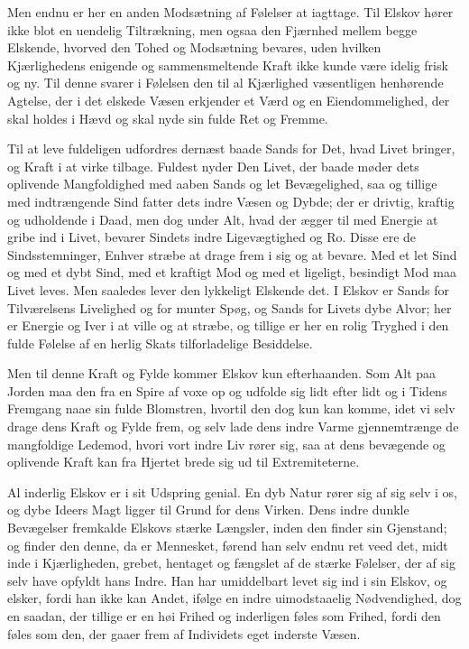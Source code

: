 \documentclass[12pt,a4paper]{book}
\newcommand{\apage}[1]{\marginnote{\footnotesize\textit{[#1]}}}
\begin{document}
Men endnu er her en anden Modsætning af Følelser at iagttage. Til Elskov
hører ikke blot en uendelig Tiltrækning, men ogsaa den Fjærnhed mellem
begge Elskende, hvorved den Tohed og Modsætning bevares, uden hvilken
Kjærlighedens enigende og sammensmeltende Kraft ikke kunde være idelig
frisk og ny. Til denne svarer i Følelsen den til al Kjærlighed
væsentligen henhørende Agtelse, der i det elskede Væsen erkjender et
Værd og en Eiendommelighed, der skal holdes i Hævd og skal nyde sin
fulde Ret og Fremme.

Til at leve fuldeligen udfordres dernæst baade Sands for Det, hvad Livet
bringer, og Kraft i at virke tilbage. Fuldest nyder Den Livet, der baade
møder dets oplivende Mangfoldighed med aaben Sands og let Bevægelighed,
saa og tillige med indtrængende Sind fatter dets indre Væsen og Dybde;
der er drivtig, kraftig og udholdende i Daad, men dog under Alt, hvad
der ægger til med Energie at gribe ind i Livet, bevarer Sindets indre
Ligevægtighed og Ro. Disse ere de Sindsstemninger, Enhver stræbe at
drage frem i sig og at bevare. Med et let Sind og med et dybt Sind, med
et kraftigt Mod og med et ligeligt, besindigt Mod maa Livet leves. Men
saaledes lever den lykkeligt Elskende det. I Elskov er Sands for
Tilværelsens Livelighed og for munter Spøg, og Sands for Livets dybe
Alvor; her er Energie og Iver i at ville og at stræbe, og tillige er her
en rolig Tryghed \apage{58} i den fulde Følelse af en herlig Skats tilforladelige
Besiddelse.

Men til denne Kraft og Fylde kommer Elskov kun efterhaanden. Som Alt paa
Jorden maa den fra en Spire af voxe op og udfolde sig lidt efter lidt og
i Tidens Fremgang naae sin fulde Blomstren, hvortil den dog kun kan
komme, idet vi selv drage dens Kraft og Fylde frem, og selv lade dens
indre Varme gjennemtrænge de mangfoldige Ledemod, hvori vort indre Liv
rører sig, saa at dens bevægende og oplivende Kraft kan fra Hjertet
brede sig ud til Extremiteterne.

Al inderlig Elskov er i sit Udspring genial. En dyb Natur rører sig af
sig selv i os, og dybe Ideers Magt ligger til Grund for dens Virken.
Dens indre dunkle Bevægelser fremkalde Elskovs stærke Længsler, inden
den finder sin Gjenstand; og finder den denne, da er Mennesket, førend
han selv endnu ret veed det, midt inde i Kjærligheden, grebet, hentaget
og fængslet af de stærke Følelser, der af sig selv have opfyldt hans
Indre. Han har umiddelbart levet sig ind i sin Elskov, og elsker, fordi
han ikke kan Andet, ifølge en indre uimodstaaelig Nødvendighed, dog en
saadan, der tillige er en høi Frihed og inderligen føles som Frihed,
fordi den føles som den, der gaaer frem af Individets eget inderste
Væsen.
\end{document}
